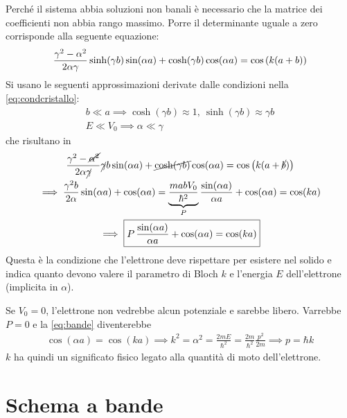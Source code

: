 Perché il sistema abbia soluzioni non banali è necessario che la matrice dei coefficienti non abbia rango massimo.
Porre il determinante uguale a zero corrisponde alla seguente equazione:
\begin{equation}
    \frac{\gamma^2 - \alpha^2}{2 \alpha \gamma} \sinh(\gamma b) \sin(\alpha a) + \cosh(\gamma b) \cos(\alpha a) = \cos\left( k(a + b) \right)
\end{equation}
Si usano le seguenti approssimazioni derivate dalle condizioni nella \eqref{eq:condcristallo}:
\begin{subequations}
    \begin{gather}
        b \ll a \implies \cosh(\gamma b) \approx 1, \ \sinh(\gamma b) \approx \gamma b \\
        E \ll V_0 \implies \alpha \ll \gamma
    \end{gather}
\end{subequations}
che risultano in
\begin{equation}
\label{eq:bande}
    \begin{gathered}
        \frac{\gamma^2 - \cancel{\alpha^2}}{2 \alpha \cancel{\gamma}} \cancel{\gamma} b \sin(\alpha a) + \cancel{\cosh(\gamma b)} \cos(\alpha a) = \cos\left( k(a + \cancel{b}) \right) \\
        \implies \frac{\gamma^2 b}{2 \alpha} \sin(\alpha a) + \cos(\alpha a) = \underbrace{\frac{m a b V_0}{\hbar^2}}_P \frac{\sin(\alpha a)}{\alpha a} + \cos(\alpha a) = \cos(ka) \\
        \implies
        \boxed{P \, \frac{\sin(\alpha a)}{\alpha a} + \cos(\alpha a) = \cos(ka)}
    \end{gathered}
\end{equation}
Questa è la condizione che l'elettrone deve rispettare per esistere nel solido e indica quanto devono valere il parametro di Bloch $k$ e l'energia $E$ dell'elettrone (implicita in $\alpha$).

Se $V_0 = 0$, l'elettrone non vedrebbe alcun potenziale e sarebbe libero.
Varrebbe $P = 0$ e la \eqref{eq:bande} diventerebbe
\begin{gather}
    \cos(\alpha a) = \cos(k a)
    \implies
    k^2 = \alpha^2 = \frac{2 m E}{\hbar^2} = \frac{2 m}{\hbar^2} \frac{p^2}{2 m}
    \implies
    p = \hbar k
\end{gather}
$k$ ha quindi un significato fisico legato alla quantità di moto dell'elettrone.

\section{Schema a bande}

